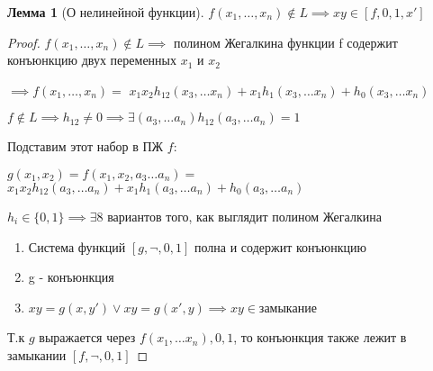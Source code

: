 \documentclass[a4paper]{article}
\newtheorem{lemma}{Лемма}[section]
\theoremstyle{definition}
\theoremstyle{remark}
\begin{document}
    \begin{lemma}[О нелинейной функции]
        $f(x_1, \dots, x_n) \notin L \implies xy \in [f, 0, 1, x']$
    \end{lemma}
    \begin{proof}
        $f(x_1, \dots, x_n) \notin L\implies$ полином Жегалкина функции f содержит конъюнкцию двух переменных $x_1$ и $x_2$
    
        $\implies f(x_1, \dots, x_n)=$
        $x_1x_2h_{12}(x_3, \dots x_n) + x_1h_1(x_3, \dots x_n) + h_0(x_3, \dots x_n)$
        
        $f\notin L \implies h_{12}\neq 0 \implies \exists (a_3, \dots a_n) h_{12} (a_3, \dots a_n) = 1$

        Подставим этот набор в ПЖ $f$:

        $g(x_1, x_2) = f(x_1, x_2, a_3\dots  a_n) = $
        $x_1x_2h_{12}(a_3, \dots a_n) + x_1h_1(a_3, \dots a_n) + h_0(a_3, \dots a_n)$

        $h_i\in \{0, 1\}\implies \exists 8$ вариантов того, как выглядит полином Жегалкина

        \begin{enumerate}
            \item Система функций $[g, \neg, 0, 1]$ полна и содержит конъюнкцию
            \item g - конъюнкция
            \item $xy = g(x, y') \vee xy = g(x', y)\implies xy \in $замыкание
        \end{enumerate}
        Т.к $g$ выражается через $f(x_1, \dots x_n), 0, 1$, то конъюнкция также лежит в замыкании $[f, \neg, 0, 1]$

    \end{proof}
\end{document}
